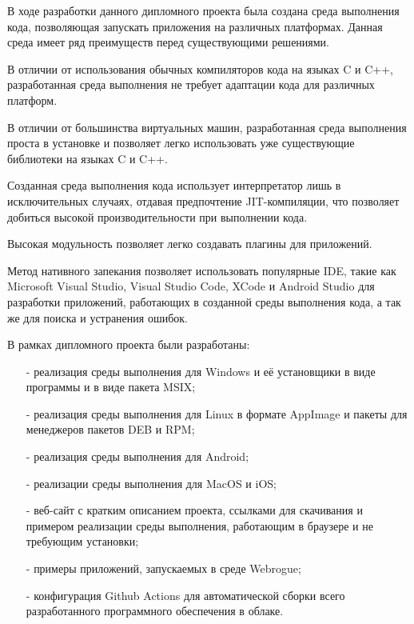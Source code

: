 В ходе разработки данного дипломного проекта была создана среда выполнения кода, позволяющая запускать приложения на различных платформах.
Данная среда имеет ряд преимуществ перед существующими решениями.

В отличии от использования обычных компиляторов кода на языках C и C++, разработанная среда выполнения не требует адаптации кода для различных платформ. 

В отличии от большинства виртуальных машин, разработанная среда выполнения проста в установке и позволяет легко использовать уже существующие библиотеки на языках C и C++.

Созданная среда выполнения кода использует интерпретатор лишь в исключительных случаях, отдавая предпочтение JIT-компиляции, что позволяет добиться высокой производительности при выполнении кода.

Высокая модульность позволяет легко создавать плагины для приложений.

Метод нативного запекания позволяет использовать популярные IDE, такие как Microsoft Visual Studio, Visual Studio Code, XCode и Android Studio для разработки приложений, работающих в созданной среды выполнения кода, а так же для поиска и устранения ошибок.

В рамках дипломного проекта были разработаны:
\begin{itemize}
    \item[-] реализация среды выполнения для Windows и её установщики в виде программы и в виде пакета MSIX;
    \item[-] реализация среды выполнения для Linux в формате AppImage и пакеты для менеджеров пакетов DEB и RPM;
    \item[-] реализация среды выполнения для Android;
    \item[-] реализации среды выполнения для MacOS и iOS;
    \item[-] веб-сайт с кратким описанием проекта, ссылками для скачивания и примером реализации среды выполнения, работающим в браузере и не требующим установки;
    \item[-] примеры приложений, запускаемых в среде Webrogue;
    \item[-] конфигурация Github Actions для автоматической сборки всего разработанного программного обеспечения в облаке.
\end{itemize}

